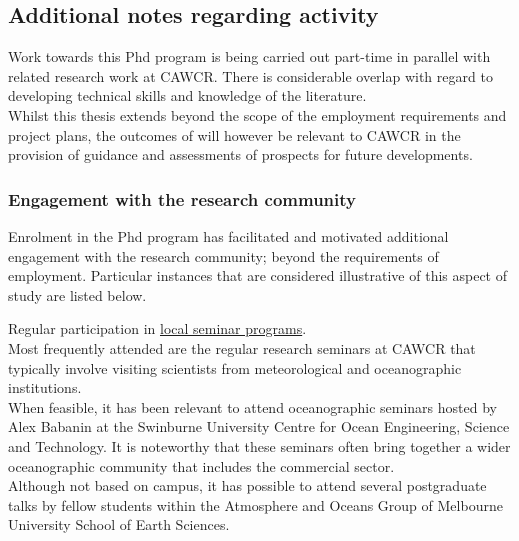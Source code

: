 \subsection{Additional notes regarding activity} 
Work towards this Phd program is being carried out part-time in parallel with related research work at CAWCR.  There is considerable overlap with regard to developing technical skills and knowledge of the literature. \\
Whilst this thesis extends beyond the scope of the employment requirements and project plans, the outcomes of will however be relevant to CAWCR in the provision of guidance and assessments of prospects for future developments.\\

\subsubsection{Engagement with the research community}
Enrolment in the Phd program has facilitated and motivated additional engagement with the research community; beyond the requirements of employment.  Particular instances that are considered illustrative of this aspect of study are listed below.


Regular participation in \underline{local seminar programs}.\\
Most frequently attended are the regular research seminars at CAWCR that typically involve visiting scientists from meteorological and oceanographic institutions.\\
When feasible, it has been relevant to attend oceanographic seminars hosted by Alex Babanin at the Swinburne University Centre for Ocean Engineering, Science and Technology.  It is noteworthy that these seminars often bring together a wider oceanographic community that includes the commercial sector.\\
Although not based on campus, it has possible to attend several postgraduate talks by fellow students within the Atmosphere and Oceans Group of Melbourne University School of Earth Sciences.\\


